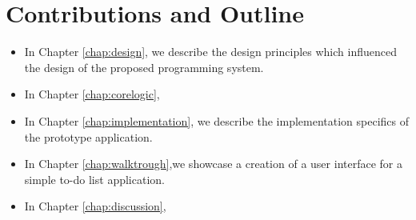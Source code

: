 \section* {Contributions and Outline}
\begin{itemize}
	\item In Chapter \ref{chap:design}, we describe the design principles which influenced the design of the proposed programming system.
	\item In Chapter \ref{chap:corelogic}, 
	\item In Chapter \ref{chap:implementation}, we describe the implementation specifics of the prototype application.
	\item In Chapter \ref{chap:walktrough},we showcase a creation of a user interface for a simple to-do list application.
	\item In Chapter \ref{chap:discussion}, 
\end{itemize}
